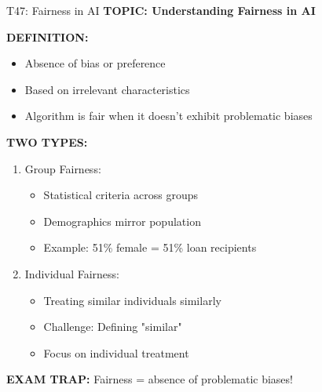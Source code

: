 \documentclass[8pt]{beamer}
\begin{document}
	\begin{frame}{T47: Fairness in AI}
		\fontsize{6.5}{7.5}\selectfont
		\textbf{TOPIC: Understanding Fairness in AI}
		
		\vspace{0.1cm}
		\textbf{DEFINITION:}
		\begin{itemize}
			\item Absence of bias or preference
			\item Based on irrelevant characteristics
			\item Algorithm is fair when it doesn't exhibit problematic biases
		\end{itemize}
		
		\vspace{0.1cm}
		\textbf{TWO TYPES:}
		\begin{enumerate}
			\item \textcolor{myblue}{Group Fairness:}
			\begin{itemize}
				\item Statistical criteria across groups
				\item Demographics mirror population
				\item Example: 51\% female = 51\% loan recipients
			\end{itemize}
			\item \textcolor{myblue}{Individual Fairness:}
			\begin{itemize}
				\item Treating similar individuals similarly
				\item Challenge: Defining "similar"
				\item Focus on individual treatment
			\end{itemize}
		\end{enumerate}
		
		\textcolor{myred}{\textbf{EXAM TRAP:}} Fairness = \textcolor{myblue}{absence of problematic biases}!
	\end{frame}
	
\end{document}
